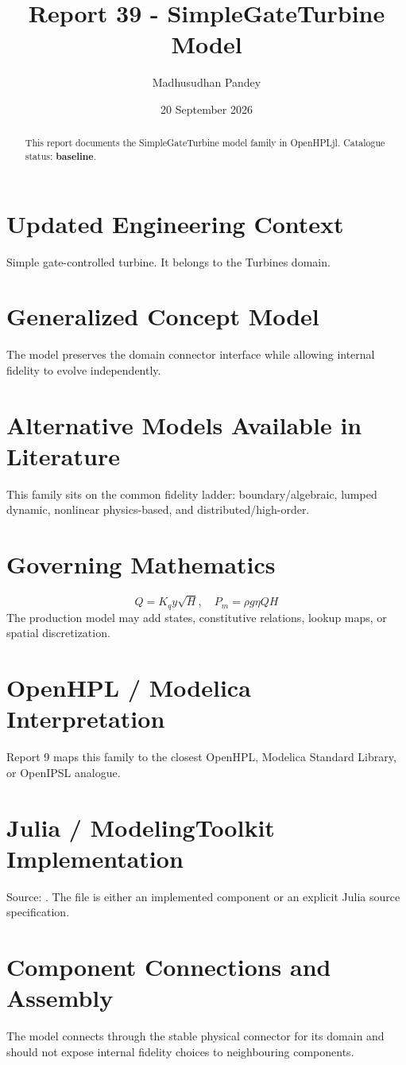 \documentclass[10pt,a4paper]{article}
\title{Report 39 - SimpleGateTurbine Model}
\author{Madhusudhan Pandey}
\date{20 September 2026}
\begin{document}
\maketitle
\begin{abstract}This report documents the SimpleGateTurbine model family in OpenHPLjl. Catalogue status: \textbf{baseline}.\end{abstract}
\section{Updated Engineering Context}Simple gate-controlled turbine. It belongs to the Turbines domain.
\section{Generalized Concept Model}The model preserves the domain connector interface while allowing internal fidelity to evolve independently.
\section{Alternative Models Available in Literature}This family sits on the common fidelity ladder: boundary/algebraic, lumped dynamic, nonlinear physics-based, and distributed/high-order.
\section{Governing Mathematics}\[Q=K_q y\sqrt H,\quad P_m=\rho g\eta QH\]The production model may add states, constitutive relations, lookup maps, or spatial discretization.
\section{OpenHPL / Modelica Interpretation}Report 9 maps this family to the closest OpenHPL, Modelica Standard Library, or OpenIPSL analogue.
\section{Julia / ModelingToolkit Implementation}Source: \texttt{}. The file is either an implemented component or an explicit Julia source specification.
\section{Component Connections and Assembly}The model connects through the stable physical connector for its domain and should not expose internal fidelity choices to neighbouring components.
\end{document}
